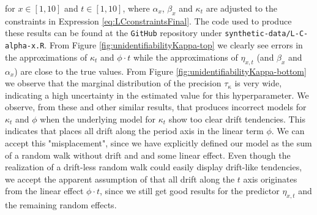 for $x\in[1,10]$ and $t\in[1,10]$, where $\alpha_x$, $\beta_x$ and $\kappa_t$ are adjusted to the constraints in Expression \ref{eq:LCconstraintsFinal}. The code used to produce these results can be found at the \texttt{GitHub} repository under \texttt{synthetic-data/L-C-alpha-x.R}. From Figure \ref{fig:unidentifiabilityKappa-top} we clearly see errors in the approximations of $\kappa_t$ and $\phi\cdot t$ while the approximations of $\eta_{x,t}$ (and $\beta_x$ and $\alpha_x$) are close to the true values. From Figure \ref{fig:unidentifiabilityKappa-bottom} we observe that the marginal distribution of the precision $\tau_\kappa$ is very wide, indicating a high uncertainty in the estimated value for this hyperparameter. We observe, from these and other similar results, that \inlabru produces incorrect models for $\kappa_t$ and $\phi$ when the underlying model for $\kappa_t$ show too clear drift tendencies. This indicates that \inlabru places all drift along the period axis in the linear term $\phi$. We can accept this "misplacement", since we have explicitly defined our model as the sum of a random walk without drift and and some linear effect. Even though the realization of a drift-less random walk could easily display drift-like tendencies, we accept the apparent assumption of \inlabru that all drift along the $t$ axis originates from the linear effect $\phi \cdot t$, since we still get good results for the predictor $\eta_{x,t}$ and the remaining random effects.
\newline
